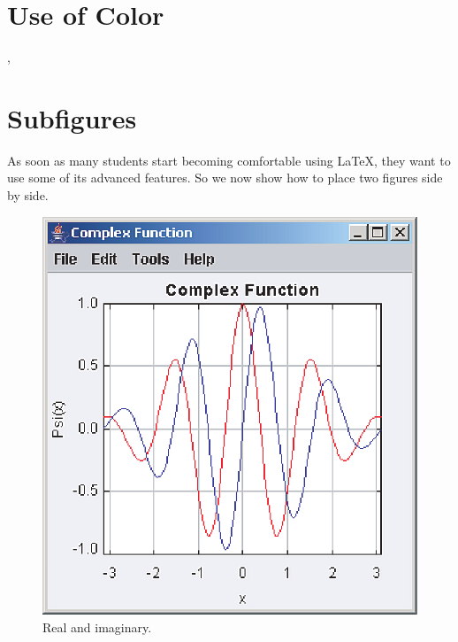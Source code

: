 \documentclass[12pt]{article}
\begin{document}
\section{\color{red}Use of Color}

{\color{blue}{We can change colors for emphasis}},
{\color{green}{but}} {\color{cyan}{who is going pay for the ink?}}

\section{\label{morefig}Subfigures}

As soon as many students start becoming comfortable using \LaTeX, they want to use some of its advanced features. So we now show how to place two figures side by side.

\begin{figure}[!ht]
\centering
\begin{subcaptionblock}{.4\textwidth}
\centering
\includegraphics[scale=0.5]{figures/reim}
\caption{Real and imaginary.}
\label{ri}
\end{subcaptionblock}
\begin{subcaptionblock}{.4\textwidth}
\centering

\end{subcaptionblock}
\end{figure}
\end{document}
